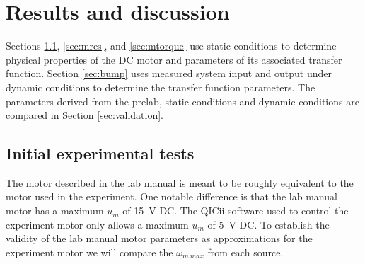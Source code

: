 \section{Results and discussion}\label{sec:results}
Sections \ref{sec:initial}, \ref{sec:mres}, and \ref{sec:mtorque} use static conditions to determine physical properties of the DC motor and parameters of its associated transfer function.
Section \ref{sec:bump} uses measured system input and output under dynamic conditions to determine the transfer function parameters.
The parameters derived from the prelab, static conditions and dynamic conditions are compared in Section \ref{sec:validation}.

\subsection{Initial experimental tests}\label{sec:initial}
The motor described in the lab manual \cite{lab-manual} is meant to be roughly equivalent to the motor used in the experiment.
One notable difference is that the lab manual motor has a maximum $u_m$ of \SI{15}{\volt} DC.
The QICii software used to control the experiment motor only allows a maximum $u_m$ of \SI{5}{\volt} DC.
To establish the validity of the lab manual motor parameters as approximations for the experiment motor we will compare the $\omega_{m\>max}$ from each source.

